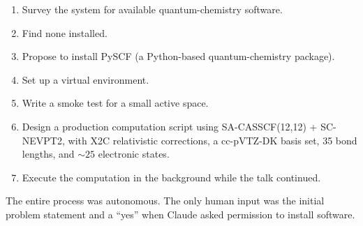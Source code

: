 \begin{enumerate}[(1)]
  \item Survey the system for available quantum-chemistry software.
  \item Find none installed.
  \item Propose to install PySCF (a Python-based quantum-chemistry
    package).
  \item Set up a virtual environment.
  \item Write a smoke test for a small active space.
  \item Design a production computation script using SA-CASSCF(12,12) +
    SC-NEVPT2, with X2C relativistic corrections, a cc-pVTZ-DK basis
    set, 35 bond lengths, and ${\sim}25$ electronic states.
  \item Execute the computation in the background while the talk
    continued.
\end{enumerate}

The entire process was autonomous.  The only human input was the initial
problem statement and a ``yes'' when Claude asked permission to install
software.
